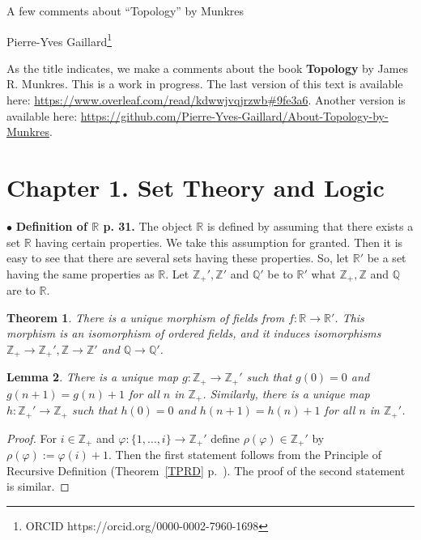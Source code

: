 \documentclass[12pt,letterpaper]{article}
\newtheorem{thm}{Theorem}%
\newtheorem{lem}[thm]{Lemma}
\newcommand{\noi}{\noindent}%
\newcommand{\Q}{\mathbb Q}%
\newcommand{\R}{\mathbb R}
\newcommand{\Z}{\mathbb Z}
\begin{document}
\begin{center}{\Huge A few comments about ``Topology'' by Munkres}\bigskip 

Pierre-Yves Gaillard\footnote{ORCID https://orcid.org/0000-0002-7960-1698} 
\end{center}%

\tableofcontents\bigskip

\noi As the title indicates, we make a comments about the book \textbf{Topology} by James R. Munkres. This is a work in progress. The last version of this text is available here: \url{https://www.overleaf.com/read/kdwwjvqjrzwb#9fe3a6}. Another version is available here: \url{https://github.com/Pierre-Yves-Gaillard/About-Topology-by-Munkres}. 

\section{Chapter 1. Set Theory and Logic}

\noi$\bullet$ \textbf{Definition of $\R$ p. 31.} The object $\R$ is defined by assuming that there exists a set $\R$ having certain properties. We take this assumption for granted. Then it is easy to see that there are several sets having these properties. So, let $\R'$ be a set having the same properties as $\R$. Let $\Z_+',\Z'$ and $\Q'$ be to $\R'$ what $\Z_+,\Z$ and $\Q$ are to $\R$. 

\begin{thm}\label{Tumf}
There is a unique morphism of fields from $f:\R\to\R'$. This morphism is an isomorphism of ordered fields, and it induces isomorphisms $\Z_+\to\Z_+',\Z\to\Z'$ and $\Q\to\Q'$. 
\end{thm}

\begin{lem}\label{Lgh}
There is a unique map $g:\Z_+\to\Z_+'$ such that $g(0)=0$ and $g(n+1)=g(n)+1$ for all $n$ in $\Z_+$. Similarly, there is a unique map $h:\Z_+'\to\Z_+$ such that $h(0)=0$ and $h(n+1)=h(n)+1$ for all $n$ in $\Z_+'$. 
\end{lem}

\begin{proof} 
For $i\in\Z_+$ and $\varphi:\{1,\ldots,i\}\to\Z_+'$ define $\rho(\varphi)\in\Z_+'$ by $\rho(\varphi):=\varphi(i)+1$. Then the first statement follows from the Principle of Recursive Definition (Theorem~\ref{TPRD} p.~\pageref{TPRD}). The proof of the second statement is similar. 
\end{proof}
\end{document}
